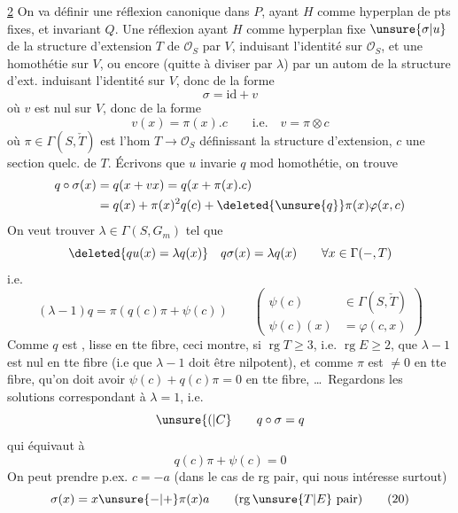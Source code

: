 \uline{2} \quad On va définir une réflexion canonique dans $P$, ayant $H$ comme hyperplan de pts fixes, et invariant $Q$. Une  réflexion  ayant $H$ comme hyperplan fixe   $\unsure{\sigma|u}$ de la structure d'extension  $T$ de $\mathcal O_S$ par $V$,  induisant l'identité sur $\mathcal O_S$, et une homothétie  sur $V$, ou encore (quitte à diviser par $\lambda$\deleted{\unsure{\varphi}}) par un autom de la structure d'ext. induisant l'identité sur $V$, donc de la forme
\[
\sigma=\mathrm{id}+v
\]
où $v$ est nul sur $V$, donc de la forme
\[
v(x)=\pi(x).c\qquad\text{i.e.}\quad v=\pi\otimes c
\]
où $\pi\in\Gamma(S,\check T)$ est l'hom $T\longrightarrow\mathcal O_S$ définissant la structure d'extension, $c$ une section quelc. de $T$. Écrivons que  $u$ invarie $q$ mod homothétie, on trouve
\[
\begin{aligned}
q\circ\sigma(x)&=q(x+vx)=q(x+\pi(x).c)\\
&=q(x)+\pi(x)^2q(c)+\deleted{\unsure{q}}\pi(x)\varphi(x,c)
\end{aligned}
\]
On veut trouver $\lambda\in\Gamma(S,G_m)$ tel que
\[
\deleted{qu(x)=\lambda q(x)}\quad q\sigma(x)=\lambda q(x)\qquad\forall x\in\Gamma(-,T)
\]
i.e.
\[
(\lambda-1)q=\pi(q(c)\pi+\psi(c))\qquad
\left(\begin{aligned}\psi(c)&\in\Gamma(S,\check T)\\\psi(c)(x)&=\varphi(c,x)\end{aligned}\right)
\]
Comme $q$ est , lisse en tte fibre, ceci montre, si $\operatorname{rg}T\geq3$, i.e. $\operatorname{rg}E\geq2$, que $\lambda-1$ est nul en tte fibre (i.e que $\lambda-1$ doit être nilpotent),  et  comme $\pi$ est $\ne0$ en tte fibre, qu'on doit avoir $\psi(c)+q(c)\pi=0$ en tte fibre, \ldots\ Regardons les solutions correspondant à $\lambda=1$, i.e.
\[
\unsure{(|C}\qquad q\circ\sigma=q
\]
qui équivaut à
\[
q(c)\pi+\psi(c)=0\tag*{(19)}
\]
 On peut prendre p.ex. $c=-a$ (dans le cas  de rg pair, qui nous intéresse surtout)
\[
\sigma(x)=x\unsure{-|+}\pi(x)a\qquad(\operatorname{rg}\unsure{T|E}\ \text{pair})\tag*{(20)}
\]
